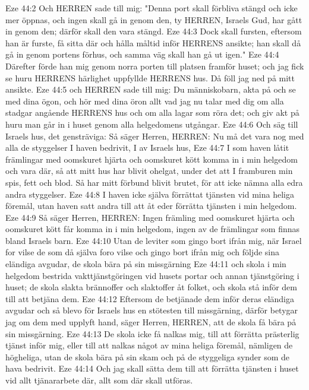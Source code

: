 Eze 44:2  Och HERREN sade till mig: "Denna port skall förbliva stängd och icke mer öppnas, och ingen skall gå in genom den, ty HERREN, Israels Gud, har gått in genom den; därför skall den vara stängd.
Eze 44:3  Dock skall fursten, eftersom han är furste, få sitta där och hålla måltid inför HERRENS ansikte; han skall då gå in genom portens förhus, och samma väg skall han gå ut igen."
Eze 44:4  Därefter förde han mig genom norra porten till platsen framför huset; och jag fick se huru HERRENS härlighet uppfyllde HERRENS hus. Då föll jag ned på mitt ansikte.
Eze 44:5  och HERREN sade till mig: Du människobarn, akta på och se med dina ögon, och hör med dina öron allt vad jag nu talar med dig om alla stadgar angående HERRENS hus och om alla lagar som röra det; och giv akt på huru man går in i huset genom alla helgedomens utgångar.
Eze 44:6  Och säg till Israels hus, det gensträviga: Så säger Herren, HERREN: Nu må det vara nog med alla de styggelser I haven bedrivit, I av Israels hus,
Eze 44:7  I som haven låtit främlingar med oomskuret hjärta och oomskuret kött komma in i min helgedom och vara där, så att mitt hus har blivit ohelgat, under det att I framburen min spis, fett och blod. Så har mitt förbund blivit brutet, för att icke nämna alla edra andra styggelser.
Eze 44:8  I haven icke själva förrättat tjänsten vid mina heliga föremål, utan haven satt andra till att åt eder förrätta tjänsten i min helgedom.
Eze 44:9  Så säger Herren, HERREN: Ingen främling med oomskuret hjärta och oomskuret kött får komma in i min helgedom, ingen av de främlingar som finnas bland Israels barn.
Eze 44:10  Utan de leviter som gingo bort ifrån mig, när Israel for vilse de som då själva foro vilse och gingo bort ifrån mig och följde sina eländiga avgudar, de skola bära på sin missgärning
Eze 44:11  och skola i min helgedom bestrida vakttjänstgöringen vid husets portar och annan tjänstgöring i huset; de skola slakta brännoffer och slaktoffer åt folket, och skola stå inför dem till att betjäna dem.
Eze 44:12  Eftersom de betjänade dem inför deras eländiga avgudar och så blevo för Israels hus en stötesten till missgärning, därför betygar jag om dem med upplyft hand, säger Herren, HERREN, att de skola få bära på sin missgärning.
Eze 44:13  De skola icke få nalkas mig, till att förrätta prästerlig tjänst inför mig, eller till att nalkas något av mina heliga föremål, nämligen de högheliga, utan de skola bära på sin skam och på de styggeliga synder som de hava bedrivit.
Eze 44:14  Och jag skall sätta dem till att förrätta tjänsten i huset vid allt tjänararbete där, allt som där skall utföras.
